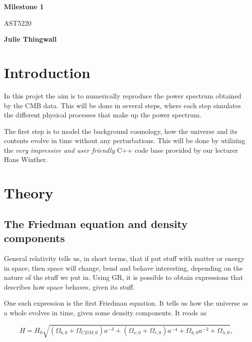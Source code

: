 \documentclass[12pt]{article}
\begin{document}
    \begin{titlepage}
        \begin{center}
            \vspace*{5cm}
            
            \Huge
            \textbf{Milestone 1}
            
            \vspace*{0.5cm}
            \LARGE
            AST5220
        
            \vspace*{0.5cm}
        
            \textbf{Julie Thingwall}
        \end{center}
    \end{titlepage}

\section{Introduction}
    In this projet the aim is to numerically reproduce the power spectrum obtained by the CMB data. This will be done in several steps, where each step simulates the different physical processes that make up the power spectrum.
    
    The first step is to model the background cosmology, how the universe and its contents evolve in time without any perturbations. This will be done by utilizing the \textit{very impressive and user friendly} C++ code base provided by our lecturer Hans Winther.



\section{Theory}
\subsection{The Friedman equation and density components}
General relativity tells us, in short terms, that if put stuff with matter or energy in space, then space will change, bend and behave interesting, depending on the nature of the stuff we put in. Using GR, it is possible to obtain expressions that describes how space behaves, given its stuff. 

One such expression is the first Friedman equation. It tells us how the universe as a whole evolves in time, given some density components. It reads as 

\begin{equation}\label{eq:Friedmann Equation}
    H = H_0\sqrt{\left(\Omega_{b,0} + \Omega_{CDM,0}\right)a^{-3} + \left(\Omega_{\nu,0} + \Omega_{r,0}\right) a^{-4} + \Omega_{k,0} a^{-2} + \Omega_{\lambda,0}},
\end{equation}
\end{document}
